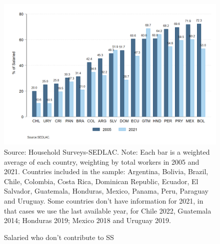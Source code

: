 \documentclass[english]{article}
\begin{document}
\begin{itemize}
\begin{figure}[!htb]
    \justifying
     \caption{Salaried who don’t contribute to SS}     
     \includegraphics[scale=.3]{latex/figures/Snapshot/snapshot_informal_ss_dep.png}
    \label{fig:SalariedSS}
    \footnotesize{Source: Household Surveys-SEDLAC.}
    \footnotesize{Note: Each bar is a weighted average of each country, weighting by total workers in 2005 and 2021. Countries included in the sample: Argentina, Bolivia, Brazil, Chile, Colombia, Costa Rica, Dominican Republic, Ecuador, El Salvador, Guatemala, Honduras, Mexico, Panama, Peru, Paraguay and Uruguay. Some countries don’t have information for 2021, in that cases we use the last available year, for Chile 2022, Guatemala 2014; Honduras 2019; Mexico 2018 and Uruguay 2019.}
\end{figure}


\end{itemize}
\end{document}
